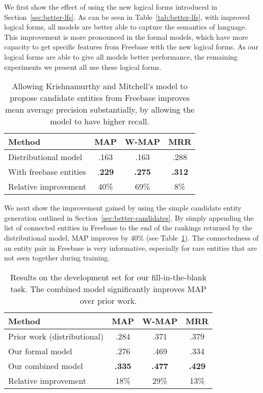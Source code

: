 \documentclass[11pt]{article}
\newcommand{\secref}[1]{Section~\ref{sec:#1}}
\newcommand{\tabref}[1]{Table~\ref{tab:#1}}
\begin{document}
We first show the effect of using the new logical forms introduced in
\secref{better-lfs}.  As can be seen in \tabref{better-lfs}, with
improved logical forms, all models are better able to capture the
semantics of language.  This improvement is more pronounced in the
formal models, which have more capacity to get specific features from
Freebase with the new logical forms.  As our logical forms are able to
give all models better performance, the remaining experiments we
present all use these logical forms.

\begin{table}
  \centering
  {\small
    \begin{tabular}{lccc}
      \toprule
      Method & MAP & W-MAP & MRR \\
      \midrule
      Distributional model & .163 & .163 & .288 \\
      \midrule
      With freebase entities & .\textbf{229} & \textbf{.275} & \textbf{.312} \\
      \midrule
      \midrule
      Relative improvement & 40\% & 69\% & 8\% \\
      \bottomrule
    \end{tabular}
  }
  \caption{Allowing Krishnamurthy and Mitchell's model to propose
  candidate entities from Freebase improves mean average precision
  substantially, by allowing the model to have higher recall.}
  \label{tab:better-candidates}
\end{table}

We next show the improvement gained by using the simple candidate
entity generation outlined in \secref{better-candidates}.  By simply
appending the list of connected entities in Freebase to the end of the
rankings returned by the distributional model, MAP improves by 40\%
(see \tabref{better-candidates}).  The connectedness of an entity pair
in Freebase is very informative, especially for rare entities that are
not seen together during training.

\begin{table}
  \centering
  {\small
    \begin{tabular}{lccc}
      \toprule
      Method & MAP & W-MAP & MRR \\
      \midrule
      Prior work (distributional) & .284 & .371 & .379 \\
      \midrule
      Our formal model & .276 & .469 & .334 \\
      \midrule
      Our combined model & \textbf{.335} & \textbf{.477} & \textbf{.429} \\
      \midrule
      \midrule
      Relative improvement & 18\% & 29\% & 13\% \\
      \bottomrule
    \end{tabular}
  }
  \caption{Results on the development set for our fill-in-the-blank task.  The
  combined model significantly improves MAP over prior work.}
  \label{tab:dev-results}
\end{table}
\end{document}
